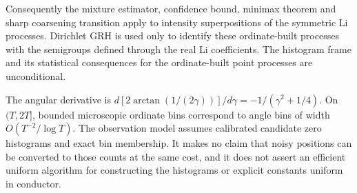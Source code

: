 Consequently the mixture estimator, confidence bound, minimax theorem
and sharp coarsening transition apply to intensity superpositions of the
symmetric Li processes.  Dirichlet GRH is used only to identify these
ordinate-built processes with the semigroups defined through the real
Li coefficients.  The histogram frame and its statistical consequences
for the ordinate-built point processes are unconditional.

The angular derivative is
$d[2\arctan(1/(2\gamma))]/d\gamma=-1/(\gamma^2+1/4)$.
On $(T,2T]$, bounded microscopic ordinate bins correspond to angle bins
of width $O(T^{-2}/\log T)$.  The observation model assumes calibrated
candidate zero histograms and exact bin membership.  It makes no claim
that noisy positions can be converted to those counts at the same cost,
and it does not assert an efficient uniform algorithm for constructing
the histograms or explicit constants uniform in conductor.

